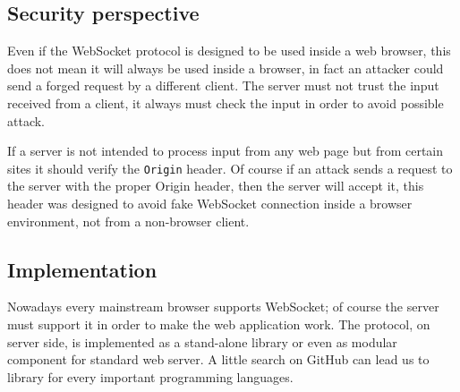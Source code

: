 \subsection{Security perspective}
Even if the WebSocket protocol is designed to be used inside a web browser, this does not mean it will always be used inside a browser, in fact an attacker could send a forged request by a different client.\newline
The server must not trust the input received from a client, it always must check the input in order to avoid possible attack.\newline

If a server is not intended to process input from any web page but from certain sites it should verify the \texttt{Origin} header.\newline
Of course if an attack sends a request to the server with the proper Origin header, then the server will accept it, this header was designed to
avoid fake WebSocket connection inside a browser environment, not from a non-browser client.\newline

\subsection{Implementation} 
Nowadays every mainstream browser supports WebSocket; of course the server must support it in order to make the web application work.\newline
The protocol, on server side, is implemented as a stand-alone library or even as modular component for standard web server.\newline
A little search on GitHub can lead us to library for every important programming languages.
